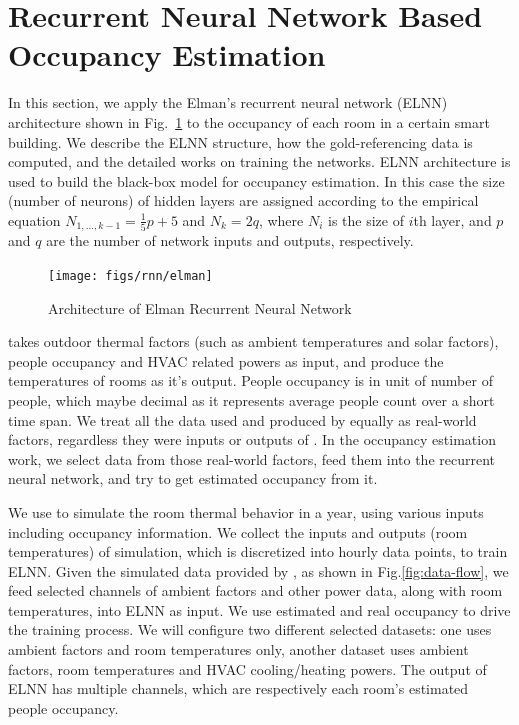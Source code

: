 \section{Recurrent Neural Network Based Occupancy Estimation}
\label{sec:rnn-method}

In this section, we apply the Elman's recurrent neural network (ELNN) architecture shown in
Fig.~\ref{fig:elman} to the occupancy of each room in a certain smart building.
We describe the ELNN structure, how the gold-referencing data is
computed, and the detailed works on training the networks. ELNN architecture is used to build the black-box model for occupancy estimation. In this case the size (number of neurons) of hidden layers are assigned according
to the empirical equation $N_{1,\ldots,k-1}=\frac15p+5$ and $N_k=2q$, where $N_i$
is the size of $i$th layer, and $p$ and $q$ are the number of network
inputs and outputs, respectively.

\begin{figure}[t]
    \centering
    \texttt{[image: figs/rnn/elman]}
    \caption{Architecture of Elman Recurrent Neural Network}
    \label{fig:elman}
\end{figure}

\EP{} takes outdoor thermal factors (such as ambient temperatures and solar
factors), people occupancy and HVAC related powers as input, and produce the
temperatures of rooms as it's output. People occupancy is in unit of number of
people, which maybe decimal as it represents average people count over a short
time span. We treat all the data used and produced by \EP{} equally as
real-world factors, regardless they were inputs or outputs of \EP{}. In the
occupancy estimation work, we select data from those real-world factors, feed
them into the recurrent neural network, and try to get estimated occupancy from
it.

We use \EP{} to simulate the room thermal behavior in a year, using various
inputs including occupancy information. We collect the inputs and outputs (room
temperatures) of \EP{} simulation, which is discretized into hourly data
points, to train ELNN. Given the simulated data
provided by \EP{}, as shown in Fig.\ref{fig:data-flow}, we feed selected
channels of ambient factors and other power data, along with room temperatures,
into ELNN as input. We use estimated and real
occupancy to drive the training process. We will configure two different
selected datasets: one uses ambient factors and room temperatures only, another
dataset uses ambient factors, room temperatures and HVAC cooling/heating
powers. The output of ELNN has multiple channels, which are
respectively each room's estimated people occupancy.

